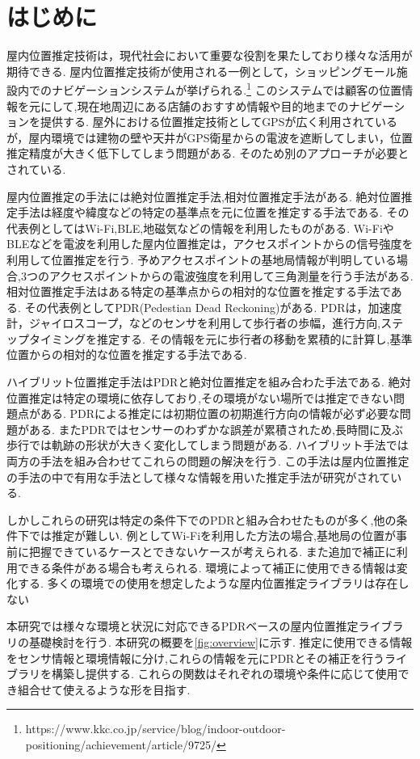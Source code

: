 \section{はじめに}
屋内位置推定技術は，現代社会において重要な役割を果たしており様々な活用が期待できる.
屋内位置推定技術が使用される一例として，ショッピングモール施設内でのナビゲーションシステムが挙げられる.\footnote{https://www.kkc.co.jp/service/blog/indoor-outdoor-positioning/achievement/article/9725/}
このシステムでは顧客の位置情報を元にして,現在地周辺にある店舗のおすすめ情報や目的地までのナビゲーションを提供する.
屋外における位置推定技術としてGPSが広く利用されているが，屋内環境では建物の壁や天井がGPS衛星からの電波を遮断してしまい，位置推定精度が大きく低下してしまう問題がある.
そのため別のアプローチが必要とされている.

屋内位置推定の手法には絶対位置推定手法,相対位置推定手法がある.
絶対位置推定手法は経度や緯度などの特定の基準点を元に位置を推定する手法である.
その代表例としてはWi-Fi,BLE,地磁気などの情報を利用したものがある.
Wi-FiやBLEなどを電波を利用した屋内位置推定は，アクセスポイントからの信号強度を利用して位置推定を行う.
予めアクセスポイントの基地局情報が判明している場合,3つのアクセスポイントからの電波強度を利用して三角測量を行う手法がある.
相対位置推定手法はある特定の基準点からの相対的な位置を推定する手法である.
その代表例としてPDR(Pedestian Dead Reckoning)がある.
PDRは，加速度計，ジャイロスコープ，などのセンサを利用して歩行者の歩幅，進行方向,ステップタイミングを推定する.
その情報を元に歩行者の移動を累積的に計算し,基準位置からの相対的な位置を推定する手法である.

ハイブリット位置推定手法はPDRと絶対位置推定を組み合わた手法である.
絶対位置推定は特定の環境に依存しており,その環境がない場所では推定できない問題点がある.
PDRによる推定には初期位置の初期進行方向の情報が必ず必要な問題がある.
またPDRではセンサーのわずかな誤差が累積されため,長時間に及ぶ歩行では軌跡の形状が大きく変化してしまう問題がある.
ハイブリット手法では両方の手法を組み合わせてこれらの問題の解決を行う.
この手法は屋内位置推定の手法の中で有用な手法として様々な情報を用いた推定手法が研究がされている.

しかしこれらの研究は特定の条件下でのPDRと組み合わせたものが多く,他の条件下では推定が難しい.
例としてWi-Fiを利用した方法の場合,基地局の位置が事前に把握できているケースとできないケースが考えられる.
また追加で補正に利用できる条件がある場合も考えられる.
環境によって補正に使用できる情報は変化する.
多くの環境での使用を想定したような屋内位置推定ライブラリは存在しない

本研究では様々な環境と状況に対応できるPDRベースの屋内位置推定ライブラリの基礎検討を行う.
本研究の概要を\ref{fig:overview}に示す.
推定に使用できる情報をセンサ情報と環境情報に分け,これらの情報を元にPDRとその補正を行うライブラリを構築し提供する.
これらの関数はそれぞれの環境や条件に応じて使用でき組合せて使えるような形を目指す.

